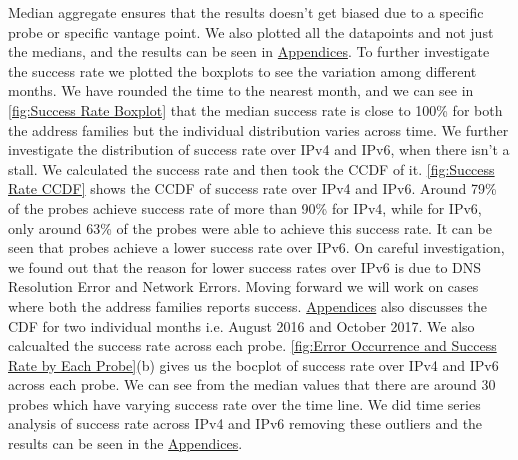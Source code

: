 Median aggregate ensures that the results doesn't get biased due to a specific probe or specific vantage point. We also plotted all the datapoints and not just the medians, and the results can be seen in \hyperref[chapter:appdataset]{Appendices}.
To further investigate the success rate we plotted the boxplots to see the variation among different months.
We have rounded the time to the nearest month, and we can see in \cref{fig:Success Rate Boxplot} that the median success rate is close to 100\% for both the address families but the individual distribution varies across time.
We further investigate the distribution of success rate over IPv4 and IPv6, when there isn't a stall. We calculated the success rate and then took the CCDF of it. 
\cref{fig:Success Rate CCDF} shows the CCDF of success rate over IPv4 and IPv6. Around 79\% of the probes achieve success rate of more than 90\% for IPv4, while for IPv6, only around 63\% of the probes were able to achieve this success rate. It can be seen that probes
achieve a lower success rate over IPv6. On careful investigation, we found out that the reason for lower success rates over IPv6 is due to DNS Resolution Error and Network Errors. Moving forward we will work on cases where both the address
families reports success. \hyperref[chapter:appdataset]{Appendices} also discusses the CDF for two individual months i.e. August 2016 and October 2017. 
We also calcualted the success rate across each probe. \cref{fig:Error Occurrence and Success Rate by Each Probe}(b) gives us the bocplot of success rate over IPv4 and IPv6 across each probe. 
We can see from the median values that there are around 30 probes which have varying success rate over the time line. We did time series analysis of success rate across IPv4 and IPv6 removing these outliers and the results
can be seen in the \hyperref[chapter:appdataset]{Appendices}.

\FloatBarrier
